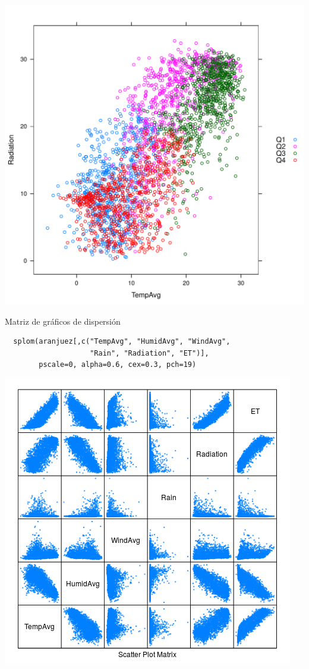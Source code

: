 \documentclass[xcolor={usenames,svgnames,dvipsnames}]{beamer}
\begin{document}
\begin{frame}[label=sec-6-1-7]{}
\includegraphics[width=.9\linewidth]{figs/xyplotQuarter.pdf}
\end{frame}

\begin{frame}[fragile,label=sec-6-1-8]{Matriz de gráficos de dispersión}
 \lstset{language=R,label= ,caption= ,numbers=none}
\begin{lstlisting}
  splom(aranjuez[,c("TempAvg", "HumidAvg", "WindAvg",
                    "Rain", "Radiation", "ET")],
        pscale=0, alpha=0.6, cex=0.3, pch=19)
\end{lstlisting}
\end{frame}

\begin{frame}[label=sec-6-1-9]{}
\includegraphics[width=.9\linewidth]{figs/splom.png}
\end{frame}
\end{document}
